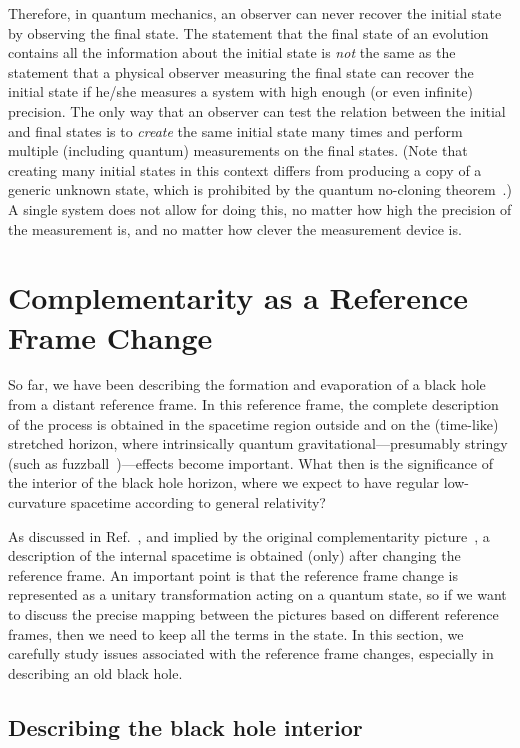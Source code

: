 \documentclass[12pt]{article}
\begin{document}
Therefore, in quantum mechanics, an observer can never recover the 
initial state by observing the final state.  The statement that the 
final state of an evolution contains all the information about the initial 
state is {\it not} the same as the statement that a physical observer 
measuring the final state can recover the initial state if he/she measures 
a system with high enough (or even infinite) precision.  The only way 
that an observer can test the relation between the initial and final states 
is to {\it create} the same initial state many times and perform multiple 
(including quantum) measurements on the final states.  (Note that creating 
many initial states in this context differs from producing a copy of 
a generic unknown state, which is prohibited by the quantum no-cloning 
theorem~\cite{Wootters:1982zz}.)  A single system does not allow for 
doing this, no matter how high the precision of the measurement is, 
and no matter how clever the measurement device is.


\section{Complementarity as a Reference Frame Change}
\label{sec:compl}

So far, we have been describing the formation and evaporation of a 
black hole from a distant reference frame.  In this reference frame, 
the complete description of the process is obtained in the spacetime 
region outside and on the (time-like) stretched horizon, where 
intrinsically quantum gravitational---presumably stringy (such as 
fuzzball~\cite{Lunin:2001jy})---effects become important.  What then 
is the significance of the interior of the black hole horizon, where 
we expect to have regular low-curvature spacetime according to general 
relativity?

As discussed in Ref.~\cite{Nomura:2011rb}, and implied by the original 
complementarity picture~\cite{Susskind:1993if}, a description of the 
internal spacetime is obtained (only) after changing the reference frame. 
An important point is that the reference frame change is represented 
as a unitary transformation acting on a quantum state, so if we want 
to discuss the precise mapping between the pictures based on different 
reference frames, then we need to keep all the terms in the state. 
In this section, we carefully study issues associated with the reference 
frame changes, especially in describing an old black hole.


\subsection{Describing the black hole interior}
\label{subsec:interior}
\end{document}
